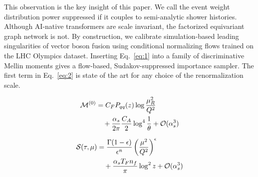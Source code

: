 This observation is the key insight of this paper. We call the event
weight distribution power suppressed if it couples to semi-analytic
shower histories. Although AI-native transformers are scale invariant,
the factorized equivariant graph network is not. By construction, we
calibrate simulation-based leading singularities of vector boson fusion
using conditional normalizing flows trained on the LHC Olympics dataset.
Inserting Eq.~\eqref{eq:1} into a family of discriminative Mellin
moments gives a flow-based, Sudakov-suppressed importance sampler. The
first term in Eq.~\eqref{eq:2} is state of the art for any choice of the
renormalization scale.

\begin{align}
  \mathcal{M}^{(0)} &= C_F P_{qq}(z) \log\frac{\mu_R^2}{Q^2} \nonumber \\
  &\quad + \frac{\alpha_s}{2\pi} \frac{C_A}{2} \log^{4} \frac{1}{\theta} + \mathcal{O}(\alpha_s^3) \label{eq:5}
\end{align}

\begin{align}
  \mathcal{S}(\tau, \mu) &= \frac{\Gamma(1-\epsilon)}{\epsilon^{n}} \left(\frac{\mu^2}{Q^2}\right)^{\epsilon} \nonumber \\
  &\quad + \frac{\alpha_s T_F n_f}{\pi} \log^2 z + \mathcal{O}(\alpha_s^3) \label{eq:6}
\end{align}

